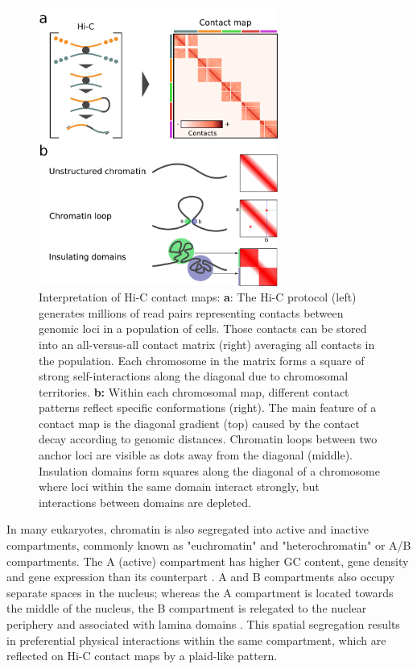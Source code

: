 \begin{figure}[htb]
    \centering
    \includegraphics[width=0.7\textwidth]{Parts/Part01/gfx/hic_interpretation.pdf}
    \caption[Interpretation of Hi-C contact maps.]{Interpretation of Hi-C contact maps: \textbf{a}: The Hi-C protocol (left) generates millions of read pairs representing contacts between genomic loci in a population of cells. Those contacts can be stored into an all-versus-all contact matrix (right) averaging all contacts in the population. Each chromosome in the matrix forms a square of strong self-interactions along the diagonal due to chromosomal territories. \textbf{b:} Within each chromosomal map, different contact patterns reflect specific conformations (right). The main feature of a contact map is the diagonal gradient (top) caused by the contact decay according to genomic distances. Chromatin loops between two anchor loci are visible as dots away from the diagonal (middle). Insulation domains form squares along the diagonal of a chromosome where loci within the same domain interact strongly, but interactions between domains are depleted.}
	\label{fig:01-02:hic}
\end{figure}

In many eukaryotes, chromatin is also segregated into active and inactive compartments, commonly known as "euchromatin" and "heterochromatin" or A/B compartments. The A (active) compartment has higher GC content, gene density and gene expression than its counterpart \cite{lieberman-aidenComprehensiveMappingLongRange2009}. A and B compartments also occupy separate spaces in the nucleus; whereas the A compartment is located towards the middle of the nucleus, the B compartment is relegated to the nuclear periphery and associated with lamina domains \cite{vansteenselLaminaAssociatedDomainsLinks2017}. This spatial segregation results in preferential physical interactions within the same compartment, which are reflected on Hi-C contact maps by a plaid-like pattern. 

